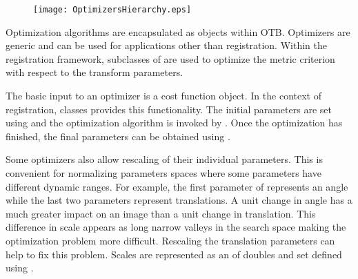 




\begin{figure}
\center
\texttt{[image: OptimizersHierarchy.eps]}
\label{fig:OptimizersHierarchy}
\end{figure}

Optimization algorithms are encapsulated as  objects
within OTB. Optimizers are generic and can be used for applications other than
registration.  Within the registration framework, subclasses of
 are used to optimize the metric
criterion with respect to the transform parameters.


The basic input to an optimizer is a cost function object. In the context
of registration,  classes provides this functionality.
The initial parameters are set using  and
the optimization algorithm is invoked by .
Once the optimization has finished, the final parameters can be obtained
using .

Some optimizers also allow rescaling of their individual parameters. This is
convenient for normalizing parameters spaces where some parameters have
different dynamic ranges. For example, the first parameter of
 represents an angle while the last two parameters
represent translations. A unit change in angle has a much greater impact on an
image than a unit change in translation. This difference in scale appears as
long narrow valleys in the search space making the optimization problem more
difficult. Rescaling the translation parameters can help to fix this problem.
Scales are represented as an  of doubles and set defined using
.

